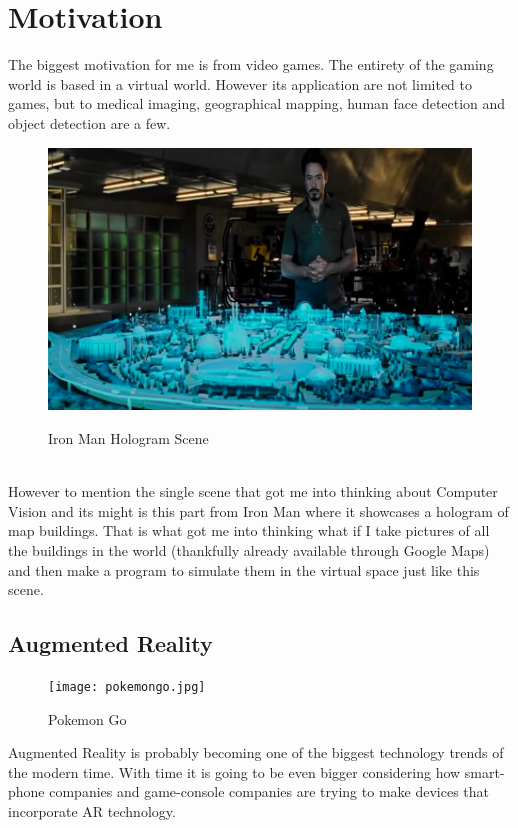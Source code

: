 \documentclass[a4paper]{report}
\begin{document}
\section{Motivation}
The biggest motivation for me is from video games. The entirety of the gaming world is based in a virtual world. However its application are not limited to games, but to medical imaging, geographical mapping, human face detection and  object detection are a few.
\begin{figure}[h]
{\includegraphics[scale=1]{ironmanmap.jpg}}
\caption{Iron Man Hologram Scene}
\end{figure}
\\
However to mention the single scene that got me into thinking about Computer Vision and its might is this part from Iron Man where it showcases a hologram of map buildings. That is what got me into thinking what if I take pictures of all the buildings in the world (thankfully already available through Google Maps) and then make a program to simulate them in the virtual space just like this scene.
\newpage
\subsection{Augmented Reality}
\begin{figure}
\centering
\texttt{[image: pokemongo.jpg]}
\caption{Pokemon Go}
\end{figure}
Augmented Reality is probably becoming one of the biggest technology trends of the modern time. With time it is going to be even bigger considering how smart-phone companies and game-console companies are trying to make devices that incorporate AR technology.
\\
\end{document}

